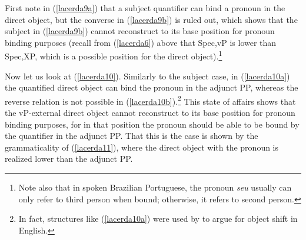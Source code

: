 \documentclass[output=paper]{langscibook}
\begin{document}
First note in (\ref{lacerda9a}) that a subject quantifier can bind a pronoun in the direct object, but the converse in (\ref{lacerda9b}) is ruled out, which shows that the subject in (\ref{lacerda9b}) cannot reconstruct to its base position for pronoun binding purposes (recall from (\ref{lacerda6}) above that Spec,vP is lower than Spec,XP, which is a possible position for the direct object).\footnote{Note also that in spoken Brazilian Portuguese, the pronoun \emph{seu} usually can only refer to third person when bound; otherwise, it refers to second person.}



\begin{exe}
\ex \label{lacerda9}
\begin{xlist}

\end{xlist}

\end{exe}

Now let us look at (\ref{lacerda10}). Similarly to the subject case, in (\ref{lacerda10a}) the quantified direct object can bind the pronoun in the adjunct PP, whereas the reverse relation is not possible in (\ref{lacerda10b}).\footnote{In fact, structures like (\ref{lacerda10a}) were used by \citet{LasnikSaito1991} to argue for object shift in English.}  This state of affairs shows that the vP-external direct object cannot reconstruct to its base position for pronoun binding purposes, for in that position the pronoun should be able to be bound by the quantifier in the adjunct PP. That this is the case is shown by the grammaticality of (\ref{lacerda11}), where the direct object with the pronoun is realized lower than the adjunct PP.
\end{document}
